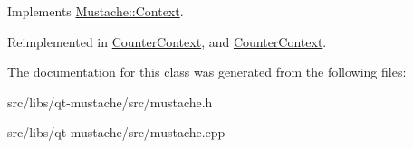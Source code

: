 Implements \hyperlink{classMustache_1_1Context_a49d5e75bc9d85b279f620b6557eefd0c}{Mustache\+::\+Context}.



Reimplemented in \hyperlink{classCounterContext_adb984d696efcc32abaaf0aaeade4f8b8}{Counter\+Context}, and \hyperlink{classCounterContext_adb984d696efcc32abaaf0aaeade4f8b8}{Counter\+Context}.



The documentation for this class was generated from the following files\+:\begin{DoxyCompactItemize}
\item 
src/libs/qt-\/mustache/src/mustache.\+h\item 
src/libs/qt-\/mustache/src/mustache.\+cpp\end{DoxyCompactItemize}
